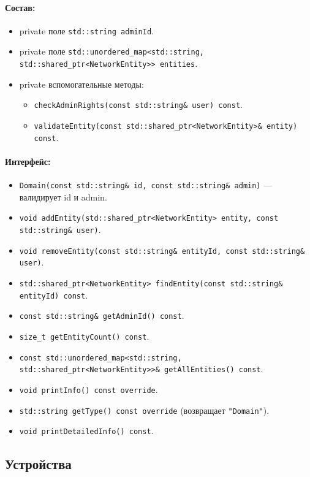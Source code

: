 \documentclass[14pt,a4paper]{extarticle}
\begin{document}
\paragraph{Состав:}
\begin{itemize}
  \item private поле \texttt{std::string adminId}.
  \item private поле \texttt{std::unordered\_map<std::string, std::shared\_ptr<NetworkEntity>> entities}.
  \item private вспомогательные методы:
  \begin{itemize}
    \item \texttt{checkAdminRights(const std::string\& user) const}.
    \item \texttt{validateEntity(const std::shared\_ptr<NetworkEntity>\& entity) const}.
  \end{itemize}
\end{itemize}
\paragraph{Интерфейс:}
\begin{itemize}
  \item \texttt{Domain(const std::string\& id, const std::string\& admin)} --- валидирует id и admin.
  \item \texttt{void addEntity(std::shared\_ptr<NetworkEntity> entity, const std::string\& user)}.
  \item \texttt{void removeEntity(const std::string\& entityId, const std::string\& user)}.
  \item \texttt{std::shared\_ptr<NetworkEntity> findEntity(const std::string\& entityId) const}.
  \item \texttt{const std::string\& getAdminId() const}.
  \item \texttt{size\_t getEntityCount() const}.
  \item \texttt{const std::unordered\_map<std::string, std::shared\_ptr<NetworkEntity>>\& getAllEntities() const}.
  \item \texttt{void printInfo() const override}.
  \item \texttt{std::string getType() const override} (возвращает \texttt{"Domain"}).
  \item \texttt{void printDetailedInfo() const}.
 \end{itemize}

\subsection{Устройства}
\end{document}
